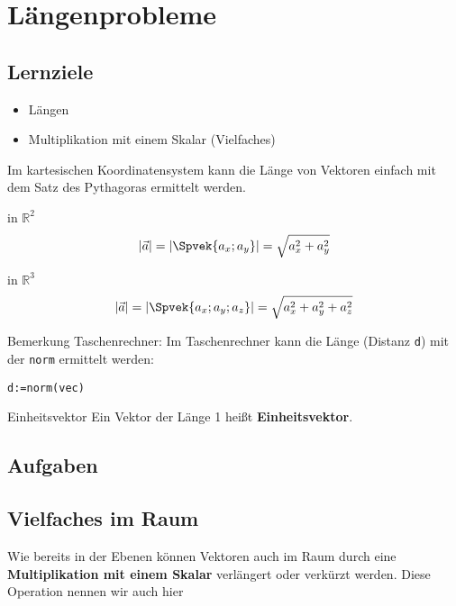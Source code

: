 \section{Längenprobleme}

\subsection*{Lernziele}
\begin{itemize}
\item Längen
\item Multiplikation mit einem Skalar (Vielfaches)
\end{itemize}

Im kartesischen Koordinatensystem kann die Länge von Vektoren einfach
mit dem Satz des Pythagoras ermittelt werden.

\begin{gesetz}{in $\mathbb{R}^2$}{}
  $$|\vec{a}| = \left| \Spvek{a_x;a_y}  \right|   = \sqrt{a_x^2 + a_y^2}$$
\end{gesetz}

\begin{gesetz}{in $\mathbb{R}^3$}{}
  $$|\vec{a}| =  \left|\Spvek{a_x;a_y;a_z}\right| = \sqrt{a_x^2 + a_y^2 + a_z^2}$$
\end{gesetz}

Bemerkung Taschenrechner: Im Taschenrechner kann die Länge (Distanz
\texttt{d}) mit der \texttt{norm} ermittelt
werden:

\texttt{d:=norm(vec)}

\begin{definition}{Einheitsvektor}{}
  Ein Vektor der Länge 1 heißt \textbf{Einheitsvektor}.
\end{definition}

\subsection*{Aufgaben}

\newpage


\subsection{Vielfaches im
  Raum}
Wie bereits in der Ebenen können Vektoren auch im Raum durch eine
\textbf{Multiplikation mit einem Skalar} verlängert oder
verkürzt werden. Diese Operation nennen wir auch hier 

